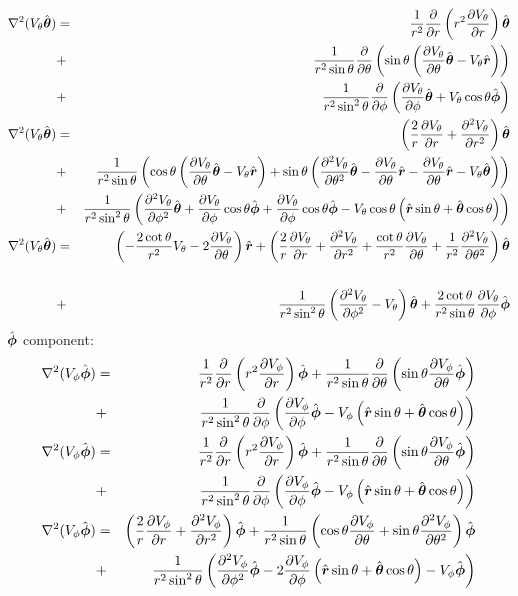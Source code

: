 \documentclass[11pt]{article}
\begin{document}
\begin{eqnarray}
\nabla^2 (V_\theta\hat{\boldsymbol{\theta}}) &=&
\frac{1}{r^2}\frac{\partial }{\partial r}\left(r^2 \frac{\partial V_\theta}{\partial r}\right)\hat{\boldsymbol{\theta}}
\\ &+&
\frac{1}{r^2\sin\theta}\frac{\partial }{\partial \theta}\left(
\sin\theta\left(\frac{\partial V_\theta}{\partial \theta}\hat{\boldsymbol{\theta}} - V_\theta\hat{\boldsymbol{r}} \right)\right)
\\ &+&
\frac{1}{r^2 \sin^2\theta}\frac{\partial }{\partial \phi}\left(
\frac{\partial V_\theta}{\partial \phi}\hat{\boldsymbol{\theta}} + V_\theta \cos\theta\hat{\boldsymbol{\phi}}
\right)
\\
\nabla^2 (V_\theta\hat{\boldsymbol{\theta}}) &=&
\left(\frac{2}{r}\frac{\partial V_\theta}{\partial r} + \frac{\partial ^2V_\theta}{\partial r^2}\right)\hat{\boldsymbol{\theta}}
\\ &+&
\frac{1}{r^2\sin\theta}\left(
\cos\theta\left(\frac{\partial V_\theta}{\partial \theta}\hat{\boldsymbol{\theta}} - V_\theta\hat{\boldsymbol{r}} \right) +
\sin\theta\left(\frac{\partial ^2V_\theta}{\partial \theta^2}\hat{\boldsymbol{\theta}} - \frac{\partial V_\theta}{\partial \theta}\hat{\boldsymbol{r}}
-\frac{\partial V_\theta}{\partial \theta}\hat{\boldsymbol{r}} - V_\theta\hat{\boldsymbol{\theta}}\right)
\right)
\\ &+&
\frac{1}{r^2 \sin^2\theta}\left(
\frac{\partial ^2V_\theta}{\partial \phi^2}\hat{\boldsymbol{\theta}} + \frac{\partial V_\theta}{\partial \phi} \cos\theta\hat{\boldsymbol{\phi}} +
\frac{\partial V_\theta}{\partial \phi}\cos\theta\hat{\boldsymbol{\phi}}
- V_\theta \cos\theta \left(\hat{\boldsymbol{r}} \sin\theta + \hat{\boldsymbol{\theta}} \cos\theta \right)
\right)
\\
\nabla^2 (V_\theta\hat{\boldsymbol{\theta}}) &=&
\left(-\frac{2\cot\theta}{r^2}V_\theta - 2\frac{\partial V_\theta}{\partial \theta}\right)\hat{\boldsymbol{r}} +
\left(\frac{2}{r}\frac{\partial V_\theta}{\partial r} + \frac{\partial ^2V_\theta}{\partial r^2} +
\frac{\cot\theta}{r^2} \frac{\partial V_\theta}{\partial \theta} +
\frac{1}{r^2}\frac{\partial ^2V_\theta}{\partial \theta^2}\right)\hat{\boldsymbol{\theta}}
\\
\\ &+&
\frac{1}{r^2 \sin^2\theta}\left(
\frac{\partial ^2V_\theta}{\partial \phi^2} - V_\theta \right)\hat{\boldsymbol{\theta}}
+ \frac{2 \cot\theta}{r^2 \sin\theta} \frac{\partial V_\theta}{\partial \phi} \hat{\boldsymbol{\phi}}
\end{eqnarray}
$\hat{\boldsymbol{\phi}}$ component:
\begin{eqnarray}
\nabla^2 (V_\phi\hat{\boldsymbol{\phi}}) &=&
\frac{1}{r^2}\frac{\partial }{\partial r}\left(r^2 \frac{\partial V_\phi}{\partial r}\right)\hat{\boldsymbol{\phi}} +
\frac{1}{r^2\sin\theta}\frac{\partial }{\partial \theta}\left(
\sin\theta \frac{\partial V_\phi}{\partial \theta}\hat{\boldsymbol{\phi}} \right)
\\ &+&
\frac{1}{r^2 \sin^2\theta}\frac{\partial }{\partial \phi}\left(
\frac{\partial V_\phi}{\partial \phi}\hat{\boldsymbol{\phi}}
- V_\phi \left(\hat{\boldsymbol{r}} \sin\theta + \hat{\boldsymbol{\theta}} \cos\theta\right)
\right)
\\
\nabla^2 (V_\phi\hat{\boldsymbol{\phi}}) &=&
\frac{1}{r^2}\frac{\partial }{\partial r}\left(r^2 \frac{\partial V_\phi}{\partial r}\right)\hat{\boldsymbol{\phi}} +
\frac{1}{r^2\sin\theta}\frac{\partial }{\partial \theta}\left(
\sin\theta \frac{\partial V_\phi}{\partial \theta}\hat{\boldsymbol{\phi}} \right)
\\ &+&
\frac{1}{r^2 \sin^2\theta}\frac{\partial }{\partial \phi}\left(
\frac{\partial V_\phi}{\partial \phi}\hat{\boldsymbol{\phi}}
- V_\phi \left(\hat{\boldsymbol{r}} \sin\theta + \hat{\boldsymbol{\theta}} \cos\theta\right)
\right)
\\
\nabla^2 (V_\phi\hat{\boldsymbol{\phi}}) &=&
\left(\frac{2}{r} \frac{\partial V_\phi}{\partial r} + \frac{\partial ^2V_\phi}{\partial r^2}\right)\hat{\boldsymbol{\phi}}
+
\frac{1}{r^2\sin\theta}\left(
\cos\theta \frac{\partial V_\phi}{\partial \theta} +
\sin\theta \frac{\partial ^2V_\phi}{\partial \theta^2}
\right)\hat{\boldsymbol{\phi}}
\\ &+&
\frac{1}{r^2 \sin^2\theta}\left(
\frac{\partial ^2V_\phi}{\partial \phi^2}\hat{\boldsymbol{\phi}}
- 2 \frac{\partial V_\phi}{\partial \phi} \left(\hat{\boldsymbol{r}} \sin\theta + \hat{\boldsymbol{\theta}} \cos\theta\right)
- V_\phi \hat{\boldsymbol{\phi}}
\right)
\end{eqnarray}
\end{document}
